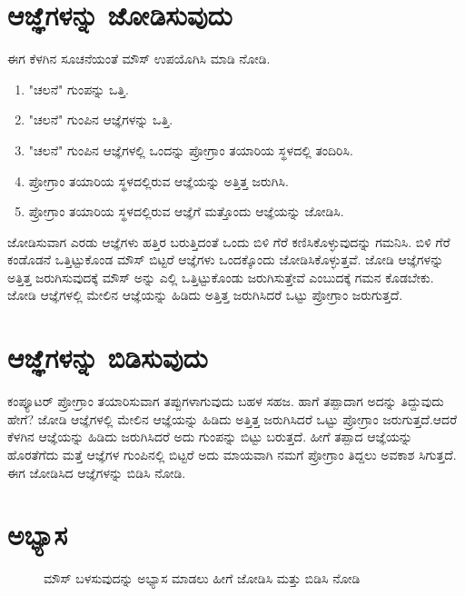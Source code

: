 \section{ಆಜ್ಞೆಗಳನ್ನು ಜೋಡಿಸುವುದು}
ಈಗ ಕೆಳಗಿನ ಸೂಚನೆಯಂತೆ ಮೌಸ್ ಉಪಯೊಗಿಸಿ ಮಾಡಿ ನೋಡಿ.  

\begin{enumerate}
\item{"ಚಲನೆ" ಗುಂಪನ್ನು ಒತ್ತಿ.}
\item{"ಚಲನೆ" ಗುಂಪಿನ ಆಜ್ಞೆಗಳನ್ನು ಒತ್ತಿ.}
\item{"ಚಲನೆ" ಗುಂಪಿನ ಆಜ್ಞೆಗಳಲ್ಲಿ ಒಂದನ್ನು ಪ್ರೋಗ್ರಾಂ ತಯಾರಿಯ ಸ್ಥಳದಲ್ಲಿ ತಂದಿರಿಸಿ.}
\item{ಪ್ರೋಗ್ರಾಂ ತಯಾರಿಯ ಸ್ಥಳದಲ್ಲಿರುವ ಆಜ್ಞೆಯನ್ನು ಅತ್ತಿತ್ತ ಜರುಗಿಸಿ.}
\item{ಪ್ರೋಗ್ರಾಂ ತಯಾರಿಯ ಸ್ಥಳದಲ್ಲಿರುವ ಆಜ್ಞೆಗೆ ಮತ್ತೊಂದು ಆಜ್ಞೆಯನ್ನು ಜೋಡಿಸಿ.}
\end{enumerate}

ಜೋಡಿಸುವಾಗ ಎರಡು ಆಜ್ಞೆಗಳು ಹತ್ತಿರ ಬರುತ್ತಿದಂತೆ ಒಂದು ಬಿಳಿ ಗೆರೆ ಕಣಿಸಿಕೊಳ್ಳುವುದನ್ನು ಗಮನಿಸಿ.  ಬಿಳಿ ಗೆರೆ ಕಂಡೊಡನೆ ಒತ್ತಿಟ್ಟುಕೊಂಡ ಮೌಸ್ ಬಿಟ್ಟರೆ ಆಜ್ಞೆಗಳು ಒಂದಕ್ಕೊಂದು ಜೋಡಿಸಿಕೊಳ್ಳುತ್ತವೆ.  ಜೋಡಿ ಆಜ್ಞೆಗಳನ್ನು ಅತ್ತಿತ್ತ ಜರುಗಿಸುವುದಕ್ಕೆ ಮೌಸ್  ಅನ್ನು ಎಲ್ಲಿ ಒತ್ತಿಟ್ಟುಕೊಂಡು ಜರುಗಿಸುತ್ತೇವೆ ಎಂಬುದಕ್ಕೆ ಗಮನ ಕೊಡಬೇಕು. ಜೋಡಿ ಆಜ್ಞೆಗಳಲ್ಲಿ ಮೇಲಿನ ಆಜ್ಞೆಯನ್ನು ಹಿಡಿದು ಅತ್ತಿತ್ತ ಜರುಗಿಸಿದರೆ ಒಟ್ಟು ಪ್ರೋಗ್ರಾಂ ಜರುಗುತ್ತದೆ.

\section{ಆಜ್ಞೆಗಳನ್ನು ಬಿಡಿಸುವುದು}
ಕಂಪ್ಯೂಟರ್ ಪ್ರೋಗ್ರಾಂ ತಯಾರಿಸುವಾಗ ತಪ್ಪುಗಳಾಗುವುದು ಬಹಳ ಸಹಜ. ಹಾಗೆ ತಪ್ಪಾದಾಗ ಅದನ್ನು ತಿದ್ದುವುದು ಹೇಗೆ? ಜೋಡಿ ಆಜ್ಞೆಗಳಲ್ಲಿ ಮೇಲಿನ ಆಜ್ಞೆಯನ್ನು ಹಿಡಿದು ಅತ್ತಿತ್ತ ಜರುಗಿಸಿದರೆ ಒಟ್ಟು ಪ್ರೋಗ್ರಾಂ ಜರುಗುತ್ತದೆ.ಆದರೆ ಕೆಳಗಿನ ಆಜ್ಞೆಯನ್ನು ಹಿಡಿದು ಜರುಗಿಸಿದರೆ ಅದು ಗುಂಪನ್ನು ಬಿಟ್ಟು ಬರುತ್ತದೆ. ಹೀಗೆ ತಪ್ಪಾದ ಆಜ್ಞೆಯನ್ನು ಹೊರತೆಗೆದು ಮತ್ತೆ ಆಜ್ಞೆಗಳ ಗುಂಪಿನಲ್ಲಿ ಬಿಟ್ಟರೆ ಅದು ಮಾಯವಾಗಿ ನಮಗೆ ಪ್ರೋಗ್ರಾಂ ತಿದ್ದಲು ಅವಕಾಶ ಸಿಗುತ್ತದೆ.  ಈಗ ಜೋಡಿಸಿದ  ಆಜ್ಞೆಗಳನ್ನು ಬಿಡಿಸಿ ನೋಡಿ.

\section{ಅಭ್ಯಾಸ}

\begin{figure}[h]
\begin{center}
\begin{Scratch}[1]
\end{Scratch}
\caption{ಮೌಸ್ ಬಳಸುವುದನ್ನು ಅಭ್ಯಾಸ ಮಾಡಲು ಹೀಗೆ ಜೋಡಿಸಿ ಮತ್ತು ಬಿಡಿಸಿ ನೋಡಿ}
\label{mouse1}
\end{center}
\end{figure}

